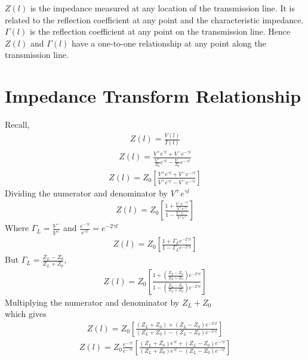 $Z(l)$ is the impedance measured at any location of the transmission line. It is related to the reflection coefficient at any point and the characteristic impedance. $\Gamma(l)$ is the reflection coefficient at any point on the transmission line. Hence $Z(l)$ and $\Gamma(l)$ have a one-to-one relationship at any point along the transmission line.

\section{Impedance Transform Relationship}
Recall,
\begin{align*}
Z(l) = \frac{V(l)}{I(l)}
\end{align*}
\begin{align*}
Z(l) = \frac{V^+e^{\gamma l} + V^-e^{-\gamma l}}{\frac{V^+}{Z_0}e^{\gamma l} - \frac{V^-}{Z_0}e^{-\gamma l}}
\end{align*}
\begin{align*}
Z(l) = Z_0[\frac{V^+e^{\gamma l} + V^-e^{-\gamma l}}{V^+e^{\gamma l} - V^-e^{-\gamma l}}]
\end{align*}
Dividing  the numerator and denominator by $V^+e^{\gamma l}$ 
\begin{align*}
Z(l) = Z_0[\frac{1 + \frac{V^-e^{-\gamma l}}{V^+e^{\gamma l}}}{1 - \frac{V^-e^{-\gamma }}{V^+e^{\gamma }}}]
\end{align*}
Where $\Gamma_L = \frac{V^-}{V^+}$ and $\frac{e^{-\gamma l}}{e^{\gamma l}} = e^{-2\gamma l}$
\begin{align}
Z(l)=  Z_0\left[\frac{1 + \Gamma_L e^{-2\gamma l}}{1 - \Gamma_L e^{-2\gamma l}}\right]
\end{align}
But $\Gamma_L
= \frac{Z_L - Z_0}{Z_L + Z_0}$,
\begin{align*}
Z(l) = Z_0 \left[\frac{1 + (\frac{Z_L - Z_0}{Z_L + Z_0})e^{-2\gamma l}}{1 - (\frac{Z_L - Z_0}{Z_L + Z_0})e^{-2\gamma l}}\right]
\end{align*}
Multiplying the numerator and denominator by $Z_L + Z_0 $\\
which gives
\begin{align*}
Z(l) = Z_0 \left[\frac{(Z_L + Z_0) + (Z_L - Z_0)e^{-2\gamma l}}{(Z_L + Z_0) - (Z_L - Z_0)e^{-2\gamma l}}\right]
\end{align*}
\begin{align*}
Z(l) = Z_0 \frac{e^{-\gamma l}}{e^{-\gamma l}}\left[\frac{(Z_L + Z_0)e^{\gamma l} + (Z_L - Z_0)e^{-\gamma l}}{(Z_L + Z_0)e^{\gamma l} - (Z_L - Z_0)e^{-\gamma l}}\right]
\end{align*}
